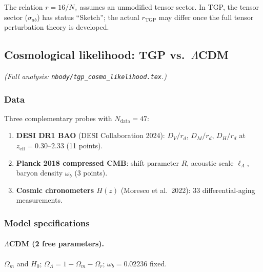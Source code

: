 \begin{remark}[Note on $r$]
The relation $r=16/N_{e}$ assumes an unmodified tensor sector.
In TGP, the tensor sector ($\sigma_{ab}$) has status ``Sketch'';
the actual $r_{\mathrm{TGP}}$ may differ once the full tensor
perturbation theory is developed.
\end{remark}

\subsection{Cosmological likelihood: TGP vs.\ $\Lambda$CDM}%
\label{ssec:likelihood-summary}

\noindent\textit{(Full analysis: \texttt{nbody/tgp\_cosmo\_likelihood.tex}.)}

\subsubsection{Data}

Three complementary probes with $N_{\mathrm{data}}=47$:
\begin{enumerate}[nosep]
  \item \textbf{DESI DR1 BAO} (DESI Collaboration 2024):
        $D_{V}/r_{d}$, $D_{M}/r_{d}$, $D_{H}/r_{d}$ at
        $z_{\mathrm{eff}}=0.30$--$2.33$ (11 points).
  \item \textbf{Planck 2018 compressed CMB}:
        shift parameter $R$, acoustic scale $\ell_{A}$,
        baryon density $\omega_{b}$ (3 points).
  \item \textbf{Cosmic chronometers $H(z)$}
        (Moresco et al.\ 2022): 33 differential-aging measurements.
\end{enumerate}

\subsubsection{Model specifications}

\paragraph{$\Lambda$CDM (2 free parameters).}
$\Omega_{m}$ and $H_{0}$;
$\Omega_{\Lambda}=1-\Omega_{m}-\Omega_{r}$;
$\omega_{b}=0.02236$ fixed.

